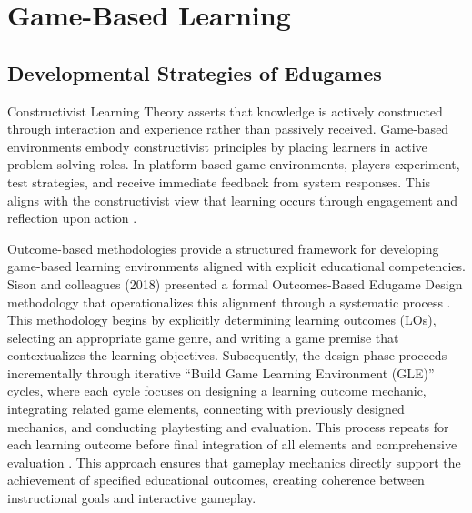\section{Game-Based Learning}

\subsection{Developmental Strategies of Edugames}

Constructivist Learning Theory asserts that knowledge is actively constructed through interaction and experience rather than passively received. Game-based environments embody constructivist principles by placing learners in active problem-solving roles. In platform-based game environments, players experiment, test strategies, and receive immediate feedback from system responses. This aligns with the constructivist view that learning occurs through engagement and reflection upon action \cite{Kolb1984, Bruner1966}.

Outcome-based methodologies provide a structured framework for developing game-based learning environments aligned with explicit educational competencies. Sison and colleagues (2018) presented a formal Outcomes-Based Edugame Design methodology that operationalizes this alignment through a systematic process \cite{Sison2018}. This methodology begins by explicitly determining learning outcomes (LOs), selecting an appropriate game genre, and writing a game premise that contextualizes the learning objectives. Subsequently, the design phase proceeds incrementally through iterative ``Build Game Learning Environment (GLE)'' cycles, where each cycle focuses on designing a learning outcome mechanic, integrating related game elements, connecting with previously designed mechanics, and conducting playtesting and evaluation. This process repeats for each learning outcome before final integration of all elements and comprehensive evaluation \cite{Sison2018}. This approach ensures that gameplay mechanics directly support the achievement of specified educational outcomes, creating coherence between instructional goals and interactive gameplay.

